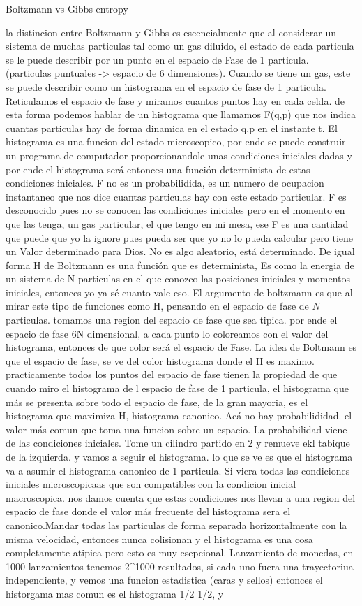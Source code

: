 Boltzmann vs Gibbs entropy

la distincion entre Boltzmann y Gibbs es escencialmente que al considerar un sistema de muchas particulas tal como un gas diluido, el estado de cada particula se le puede describir por un punto en el espacio de Fase de 1 particula. (particulas puntuales -> espacio de 6 dimensiones).
Cuando se tiene un gas, este se puede describir como un histograma en el espacio de fase de 1 particula. Reticulamos el espacio de fase y miramos cuantos puntos hay en cada celda. de esta forma podemos hablar de un histograma que llamamos F(q,p) que nos indica cuantas particulas hay de forma dinamica en el estado q,p en el instante t. El histograma es una funcion del estado microscopico, por ende se puede construir un programa de computador proporcionandole unas condiciones iniciales dadas y por ende el histograma será entonces una función determinista de estas condiciones iniciales. F no es un probabilidida, es un numero de ocupacion instantaneo que nos dice cuantas particulas hay con este estado particular. F es desconocido pues no se conocen las condiciones iniciales pero en el momento en que las tenga, un gas particular, el que tengo en mi mesa, ese F es una cantidad que puede que yo la ignore pues pueda ser que yo no lo pueda calcular pero tiene un Valor determinado para Dios. No es algo aleatorio, está determinado. De igual forma H de Boltzmann es una función que es determinista, Es como la energia de un sistema de N particulas en el que conozco las posiciones iniciales y momentos iniciales, entonces yo ya sé cuanto vale eso. El argumento de boltzmann es que al mirar este tipo de funciones como H, pensando en el espacio de fase de $N$ particulas. tomamos una region del espacio de fase que sea tipica. por ende el espacio de fase 6N dimensional, a cada punto lo coloreamos con el valor del histograma, entonces de que color será el espacio de Fase. La idea de Boltmann es que el espacio de fase, se ve del color histograma donde el H es maximo. practicamente todos los puntos del espacio de fase tienen la propiedad de que cuando miro el histograma de l espacio de fase de 1 particula, el histograma que más se presenta sobre todo el espacio de fase, de la gran mayoria, es el histograma que maximiza H, histograma canonico. Acá no hay probabilididad. el valor más comun que toma una funcion sobre un espacio. La probabilidad viene de las condiciones iniciales. Tome un cilindro partido en 2 y remueve ekl tabique de la izquierda. y vamos a seguir el histograma. lo que se ve es que el histograma va a asumir el histograma canonico de 1 particula. Si viera todas las condiciones iniciales microscopicaas que son compatibles con la condicion inicial macroscopica. nos damos cuenta que estas condiciones nos llevan a una region del espacio de fase donde el valor más frecuente del histograma sera el canonico.Mandar todas las particulas de forma separada horizontalmente con la misma velocidad, entonces nunca colisionan y el histograma es una cosa completamente atipica pero esto es muy esepcional. Lanzamiento de monedas, en 1000 lanzamientos tenemos 2^1000 resultados, si cada uno fuera una trayectoriua independiente, y vemos una funcion estadistica (caras y sellos) entonces el historgama mas comun es el histograma 1/2 1/2, y 